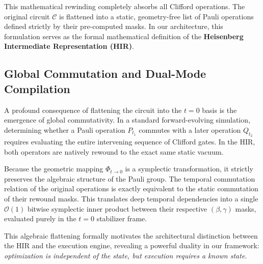 \documentclass[aps,prx,reprint,superscriptaddress,nofootinbib]{revtex4-2}
\theoremstyle{definition}
\begin{document}
This mathematical rewinding completely absorbs all Clifford operations. The original circuit $\mathcal{C}$ is flattened into a static, geometry-free list of Pauli operations defined strictly by their pre-computed masks. In our architecture, this formulation serves as the formal mathematical definition of the \textbf{Heisenberg Intermediate Representation (HIR)}.

\subsection{Global Commutation and Dual-Mode Compilation}

A profound consequence of flattening the circuit into the $t=0$ basis is the emergence of global commutativity. In a standard forward-evolving simulation, determining whether a Pauli operation $P_{t_1}$ commutes with a later operation $Q_{t_2}$ requires evaluating the entire intervening sequence of Clifford gates. In the HIR, both operators are natively rewound to the exact same static vacuum.

Because the geometric mapping $\Phi_{t \to 0}$ is a symplectic transformation, it strictly preserves the algebraic structure of the Pauli group. The temporal commutation relation of the original operations is exactly equivalent to the static commutation of their rewound masks. This translates deep temporal dependencies into a single $\mathcal{O}(1)$ bitwise symplectic inner product between their respective $(\beta, \gamma)$ masks, evaluated purely in the $t=0$ stabilizer frame.

This algebraic flattening formally motivates the architectural distinction between the HIR and the execution engine, revealing a powerful duality in our framework: \textit{optimization is independent of the state, but execution requires a known state.}
\end{document}
